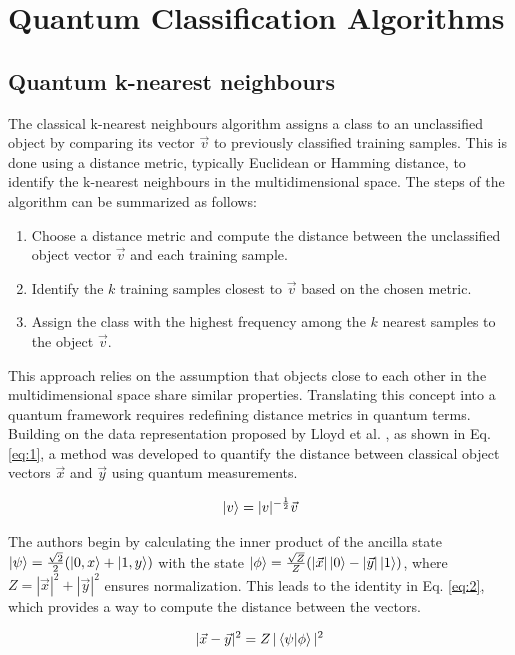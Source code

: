 \documentclass{article}
\begin{document}
\section*{Quantum Classification Algorithms}
\subsection*{Quantum k-nearest neighbours}
The classical k-nearest neighbours algorithm assigns a class to an unclassified object by comparing its vector $\vec{v}$ to previously classified training samples. This is done using a distance metric, typically Euclidean or Hamming distance, to identify the k-nearest neighbours in the multidimensional space. The steps of the algorithm can be summarized as follows:

\begin{enumerate}
    \item Choose a distance metric and compute the distance between the unclassified object vector $\vec{v}$ and each training sample.
    \item Identify the $k$ training samples closest to $\vec{v}$ based on the chosen metric.
    \item Assign the class with the highest frequency among the $k$ nearest samples to the object $\vec{v}$.
\end{enumerate}

This approach relies on the assumption that objects close to each other in the multidimensional space share similar properties. Translating this concept into a quantum framework requires redefining distance metrics in quantum terms. Building on the data representation proposed by Lloyd et al. \cite{Lloyd2013}, as shown in Eq. \ref{eq:1}, a method was developed to quantify the distance between classical object vectors $\vec{x}$ and $\vec{y}$ using quantum measurements.

\begin{equation}
    \ket{v} = |v|^{-\frac{1}{2}} \vec{v}
    \label{eq:1}
\end{equation}

The authors begin by calculating the inner product of the ancilla state $\ket{\psi} = \frac{\sqrt{2}}{2} (\ket{0, x} + \ket{1,y})$ with the state $\ket{\phi} = \frac{\sqrt{Z}}{Z}(|\vec{x}|\ket{0} - |\vec{y}|\ket{1})$, where $Z = |\vec{x}|^2 + |\vec{y}|^2$ ensures normalization. This leads to the identity in Eq. \ref{eq:2}, which provides a way to compute the distance between the vectors.

\begin{equation}
    |\vec{x} - \vec{y}|^2 = Z \, |\braket{\psi | \phi}|^2
    \label{eq:2}
\end{equation}
\end{document}

